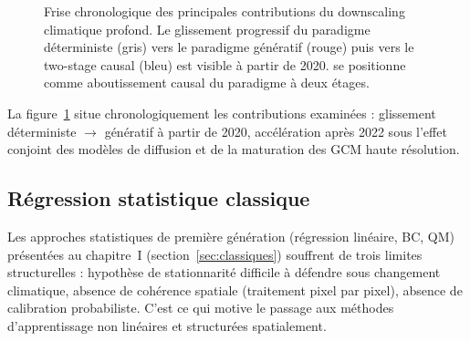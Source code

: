 \begin{figure}[ht]
{%
  }
  \caption[Frise chronologique du downscaling]{Frise chronologique des principales contributions du downscaling climatique profond. Le glissement progressif du paradigme déterministe (gris) vers le paradigme génératif (rouge) puis vers le two-stage causal (bleu) est visible à partir de 2020. \Oracle{} se positionne comme aboutissement causal du paradigme à deux étages.}
  \label{fig:frise}
\end{figure}

La figure~\ref{fig:frise} situe chronologiquement les contributions examinées : glissement déterministe $\to$ génératif à partir de 2020, accélération après 2022 sous l'effet conjoint des modèles de diffusion et de la maturation des GCM haute résolution.

\label{sec:soa-det}

\subsection{Régression statistique classique}
\label{ssec:soa-reg-classique}

Les approches statistiques de première génération (régression linéaire, BC, QM) présentées au chapitre~I (section~\ref{sec:classiques}) souffrent de trois limites structurelles : hypothèse de stationnarité difficile à défendre sous changement climatique, absence de cohérence spatiale (traitement pixel par pixel), absence de calibration probabiliste. C'est ce qui motive le passage aux méthodes d'apprentissage non linéaires et structurées spatialement.

